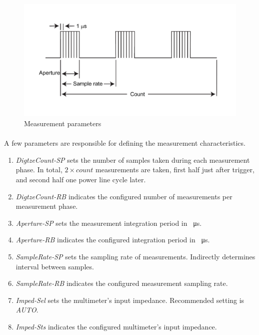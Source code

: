 \documentclass[openany]{article}
\begin{document}
		\begin{figure}[!h]
		\caption{Measurement parameters}
		\label{fig:meas-param}
		\centering
		\includegraphics[width=1.0\textwidth]{ict-meas-param-image}
		\end{figure}
\FloatBarrier

		\paragraph{} A few parameters are responsible for defining the measurement characteristics.

			\begin{enumerate}
			\item \emph{DigtzeCount-SP} sets the number of samples taken during each measurement phase. In total, $ 2\times count $ measurements are taken, first half just after trigger, and second half one power line cycle later.
			\item \emph{DigtzeCount-RB} indicates the configured number of measurements per measurement phase.
			\item \emph{Aperture-SP} sets the measurement integration period in \SI{}{\micro\second}.
			\item \emph{Aperture-RB} indicates the configured integration period in \SI{}{\micro\second}.
			\item \emph{SampleRate-SP} sets the sampling rate of measurements. Indirectly determines interval between samples.
			\item \emph{SampleRate-RB} indicates the configured measurement sampling rate.
			\item \emph{Imped-Sel} sets the multimeter's input impedance. Recommended setting is \emph{AUTO}.
			\item \emph{Imped-Sts} indicates the configured multimeter's input impedance.
			\end{enumerate}
\end{document}
